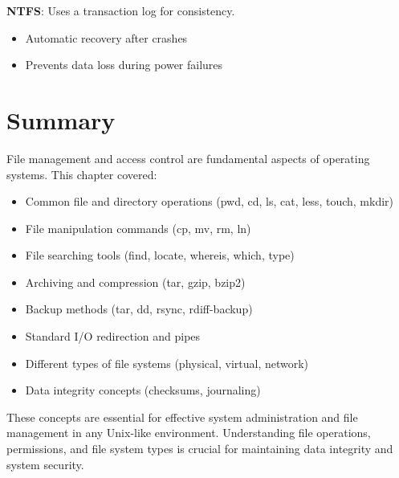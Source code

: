 \textbf{NTFS}: Uses a transaction log for consistency.
\begin{itemize}
  \item Automatic recovery after crashes
  \item Prevents data loss during power failures
\end{itemize}

\section{Summary}
\label{sec:file-mgmt:summary}

File management and access control are fundamental aspects of operating systems.
This chapter covered:

\begin{itemize}
  \item Common file and directory operations (pwd, cd, ls, cat, less, touch, mkdir)
  \item File manipulation commands (cp, mv, rm, ln)
  \item File searching tools (find, locate, whereis, which, type)
  \item Archiving and compression (tar, gzip, bzip2)
  \item Backup methods (tar, dd, rsync, rdiff-backup)
  \item Standard I/O redirection and pipes
  \item Different types of file systems (physical, virtual, network)
  \item Data integrity concepts (checksums, journaling)
\end{itemize}

These concepts are essential for effective system administration and file management in any Unix-like environment.
Understanding file operations, permissions, and file system types is crucial for maintaining data integrity and system security.
